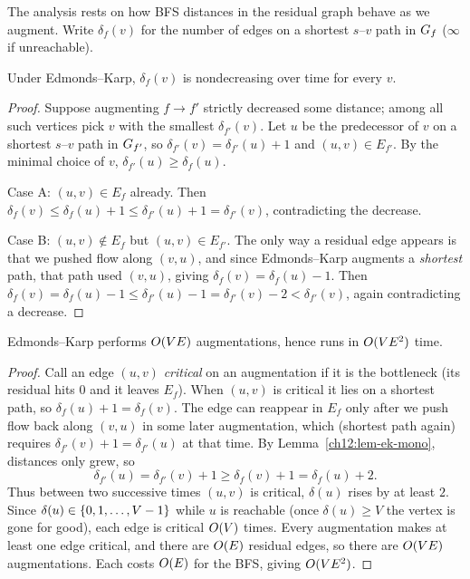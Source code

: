 The analysis rests on how BFS distances in the residual graph behave as we
augment. Write $\delta_f(v)$ for the number of edges on a shortest $s$--$v$ path in
$G_f$ ($\infty$ if unreachable).

\begin{lemma}
\label{ch12:lem-ek-mono}
Under Edmonds--Karp, $\delta_f(v)$ is nondecreasing over time for every $v$.
\end{lemma}

\begin{proof}
Suppose augmenting $f\to f'$ strictly decreased some distance; among all such
vertices pick $v$ with the smallest $\delta_{f'}(v)$. Let $u$ be the predecessor
of $v$ on a shortest $s$--$v$ path in $G_{f'}$, so $\delta_{f'}(v)=
\delta_{f'}(u)+1$ and $(u,v)\in E_{f'}$. By the minimal choice of $v$,
$\delta_{f'}(u)\ge\delta_f(u)$.

Case A: $(u,v)\in E_f$ already. Then $\delta_f(v)\le\delta_f(u)+1\le
\delta_{f'}(u)+1=\delta_{f'}(v)$, contradicting the decrease.

Case B: $(u,v)\notin E_f$ but $(u,v)\in E_{f'}$. The only way a residual edge
appears is that we pushed flow along $(v,u)$, and since Edmonds--Karp augments a
\emph{shortest} path, that path used $(v,u)$, giving $\delta_f(v)=\delta_f(u)-1$.
Then $\delta_f(v)=\delta_f(u)-1\le\delta_{f'}(u)-1=\delta_{f'}(v)-2<
\delta_{f'}(v)$, again contradicting a decrease.
\end{proof}

\begin{theorem}
\label{ch12:thm-ek}
Edmonds--Karp performs $O(VE)$ augmentations, hence runs in $O(VE^2)$ time.
\end{theorem}

\begin{proof}
Call an edge $(u,v)$ \emph{critical} on an augmentation if it is the bottleneck
(its residual hits $0$ and it leaves $E_f$). When $(u,v)$ is critical it lies on a
shortest path, so $\delta_f(u)+1=\delta_f(v)$. The edge can reappear in $E_f$ only
after we push flow back along $(v,u)$ in some later augmentation, which (shortest
path again) requires $\delta_{f'}(v)+1=\delta_{f'}(u)$ at that time. By
Lemma~\ref{ch12:lem-ek-mono}, distances only grew, so
\[
  \delta_{f'}(u)=\delta_{f'}(v)+1\ge \delta_f(v)+1=\delta_f(u)+2.
\]
Thus between two successive times $(u,v)$ is critical, $\delta(u)$ rises by at
least $2$. Since $\delta(u)\in\{0,1,\dots,V-1\}$ while $u$ is reachable (once
$\delta(u)\ge V$ the vertex is gone for good), each edge is critical $O(V)$
times. Every augmentation makes at least one edge critical, and there are $O(E)$
residual edges, so there are $O(VE)$ augmentations. Each costs $O(E)$ for the
BFS, giving $O(VE^2)$.
\end{proof}

